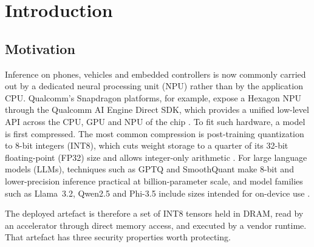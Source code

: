 \chapter{Introduction}
\label{ch:introduction}

\section{Motivation}

Inference on phones, vehicles and embedded controllers is now commonly carried out by a
dedicated neural processing unit (NPU) rather than by the application CPU. Qualcomm's
Snapdragon platforms, for example, expose a Hexagon NPU through the Qualcomm AI Engine Direct
SDK, which provides a unified low-level API across the CPU, GPU and NPU of the chip
\cite{qualcomm_qnn}. To fit such hardware, a model is first compressed. The most common
compression is post-training quantization to 8-bit integers (INT8), which cuts weight storage
to a quarter of its 32-bit floating-point (FP32) size and allows integer-only arithmetic
\cite{jacob2018quantization,nagel2021whitepaper}. For large language models (LLMs), techniques
such as GPTQ \cite{frantar2023gptq} and SmoothQuant \cite{xiao2023smoothquant} make 8-bit and
lower-precision inference practical at billion-parameter scale, and model families such as
Llama~3.2, Qwen2.5 and Phi-3.5 include sizes intended for on-device use
\cite{llama3herd,qwen25report,phi3report}.

The deployed artefact is therefore a set of INT8 tensors held in DRAM, read by an accelerator
through direct memory access, and executed by a vendor runtime. That artefact has three
security properties worth protecting.

